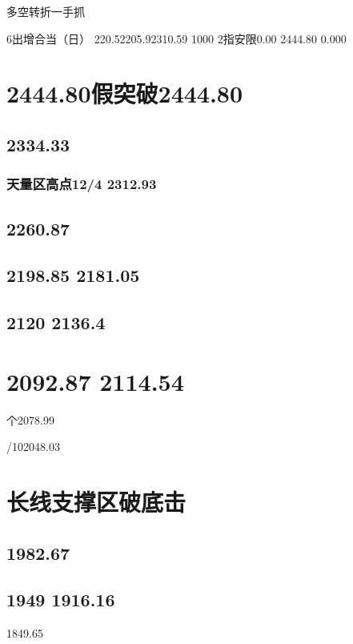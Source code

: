 \documentclass{article}
\begin{document}
\clearpage

多空转折一手抓

6出增合当（日） 220.52205.92310.59 1000 2指安限0.00 2444.80 0.000

\section{2444.80假突破2444.80}

\subsection{2334.33}

\subsubsection{天量区高点12/4 2312.93}

\subsection{2260.87}

\subsection{2198.85 2181.05}

\subsection{2120 2136.4}

\section{2092.87 2114.54}

个2078.99

/102048.03

\section{长线支撑区破底击}

\subsection{1982.67}

\subsection{1949 1916.16}

1849.65
\end{document}
